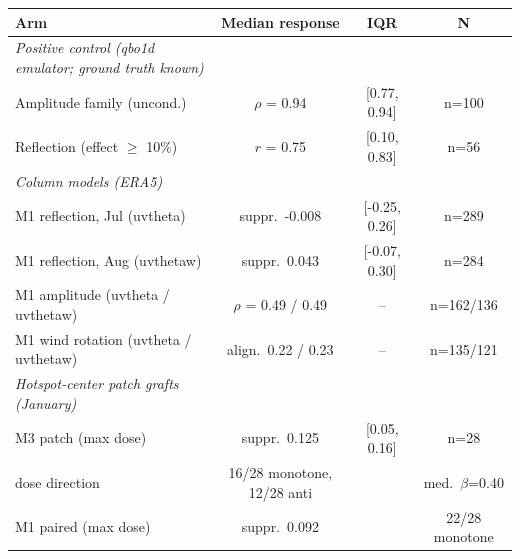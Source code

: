 \begin{tabular}{lccc}
\toprule
Arm & Median response & IQR & N \\
\midrule
\emph{Positive control (qbo1d emulator; ground truth known)} &  &  &  \\
Amplitude family (uncond.) & $\rho$ = 0.94 & [0.77, 0.94] & n=100 \\
Reflection (effect $\geq$ 10\%) & $r$ = 0.75 & [0.10, 0.83] & n=56 \\
\addlinespace\emph{Column models (ERA5)} &  &  &  \\
M1 reflection, Jul (uvtheta) & suppr.\ -0.008 & [-0.25, 0.26] & n=289 \\
M1 reflection, Aug (uvthetaw) & suppr.\ 0.043 & [-0.07, 0.30] & n=284 \\
M1 amplitude (uvtheta / uvthetaw) & $\rho$ = 0.49 / 0.49 & -- & n=162/136 \\
M1 wind rotation (uvtheta / uvthetaw) & align.\ 0.22 / 0.23 & -- & n=135/121 \\
\addlinespace\emph{Hotspot-center patch grafts (January)} &  &  &  \\
M3 patch (max dose) & suppr.\ 0.125 & [0.05, 0.16] & n=28 \\
\quad dose direction & 16/28 monotone, 12/28 anti &  & med.\ $\beta$=0.40 \\
M1 paired (max dose) & suppr.\ 0.092 &  & 22/28 monotone \\
\bottomrule
\end{tabular}
